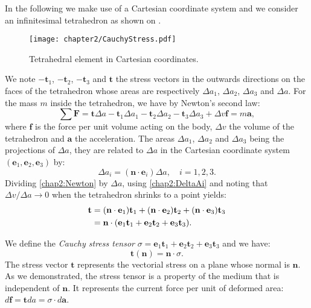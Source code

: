 \ON In the following we make use of a Cartesian coordinate system and we consider an infinitesimal tetrahedron as shown on . \OFF
%
\begin{figure}[h]
\begin{center}
\texttt{[image: chapter2/CauchyStress.pdf]}
\end{center}
\caption{Tetrahedral element in Cartesian coordinates.}
\label{chap2:fig-CauchyStress}
\end{figure}
%
We note $-\mathbf{t}_1$, $-\mathbf{t}_2$, $-\mathbf{t}_3$ and $\mathbf{t}$ the stress vectors in the outwards directions on the faces of the tetrahedron whose areas are respectively $\Delta a_1$, $\Delta a_2$, $\Delta a_3$ and $\Delta a$. For the mass $m$ inside the tetrahedron, we have by Newton's second law:
\begin{equation}
\label{chap2:Newton}
\sum \mathbf{F} = \mathbf{t} \Delta a - \mathbf{t}_1 \Delta a_1 - \mathbf{t}_2 \Delta a_2 - \mathbf{t}_3 \Delta a_3 + \Delta v \mathbf{f} = m \mathbf{a},
\end{equation}
where $\mathbf{f}$ is the force per unit volume acting on the body, $\Delta v$ the volume of the tetrahedron and $\mathbf{a}$ the acceleration.
The areas $\Delta a_1$, $\Delta a_2$ and $\Delta a_3$ being the projections of $\Delta a$, they are related to $\Delta a$ in the Cartesian coordinate system $(\mathbf{e}_1, \mathbf{e}_2, \mathbf{e}_3)$ by:
\begin{equation}
\label{chap2:DeltaAi}
\Delta a_i = (\mathbf{n} \cdot \mathbf{e}_i) \Delta a, \quad i=1, 2, 3.
\end{equation}
Dividing \eqref{chap2:Newton} by $\Delta a$, using \eqref{chap2:DeltaAi} and noting that $\Delta v \slash \Delta a \rightarrow 0$ when the tetrahedron shrinks to a point yields:
\begin{align}
\mathbf{t} &= (\mathbf{n} \cdot \mathbf{e}_1) \mathbf{t}_1 + (\mathbf{n} \cdot \mathbf{e}_2) \mathbf{t}_2 + (\mathbf{n} \cdot \mathbf{e}_3) \mathbf{t}_3 \notag \\
&= \mathbf{n} \cdot (\mathbf{e}_1 \mathbf{t}_1 + \mathbf{e}_2 \mathbf{t}_2 + \mathbf{e}_3 \mathbf{t}_3).
\end{align}

We define the \emph{Cauchy stress tensor} $\sigma = \mathbf{e}_1 \mathbf{t}_1 + \mathbf{e}_2 \mathbf{t}_2 + \mathbf{e}_3 \mathbf{t}_3$ and we have:
\begin{equation}
\label{chap2:CauchyFormula}
\mathbf{t}(\mathbf{n}) = \mathbf{n} \cdot \sigma .
\end{equation}
The stress vector $\mathbf{t}$ represents the vectorial stress on a plane whose normal is $\mathbf{n}$. As we demonstrated, the stress tensor is a property of the medium that is independent of $\mathbf{n}$. It represents the current force per unit of deformed area: $d\mathbf{f} = \mathbf{t} da = \sigma \cdot d\mathbf{a}$. 

